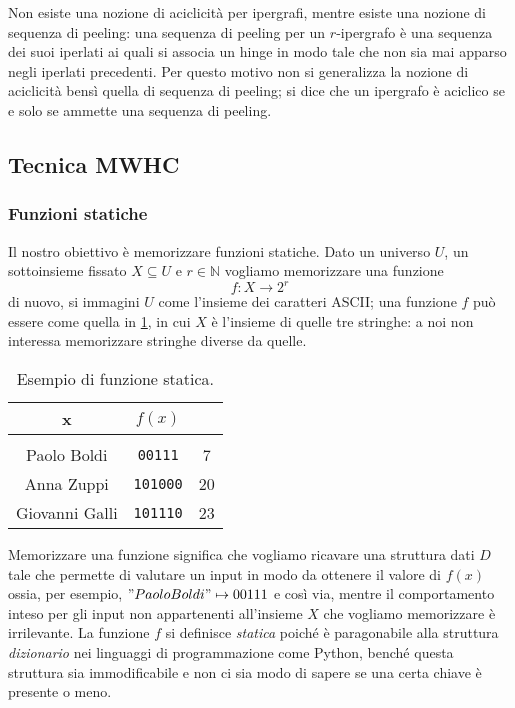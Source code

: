 Non esiste una nozione di aciclicità per ipergrafi, mentre esiste una nozione di
sequenza di peeling: una sequenza di peeling per un $r$-ipergrafo è una sequenza
dei suoi iperlati ai quali si associa un hinge in modo tale che non sia mai apparso
negli iperlati precedenti.
Per questo motivo non si generalizza la nozione di aciclicità bensì quella di sequenza di peeling;
si dice che un ipergrafo è aciclico se e solo se ammette una sequenza di peeling.


\subsection{Tecnica MWHC}
\subsubsection{Funzioni statiche}
Il nostro obiettivo è memorizzare funzioni statiche.
Dato un universo $U$, un sottoinsieme fissato $X \subseteq U$ e $r \in \mathbb{N}$
vogliamo memorizzare una funzione
$$
	f: X \rightarrow 2^r
$$
di nuovo, si immagini $U$ come l'insieme dei caratteri ASCII;
una funzione $f$ può essere come quella in \cref{tab:example:static_func},
in cui $X$ è l'insieme di quelle tre stringhe: a noi non interessa
memorizzare stringhe diverse da quelle.

\begin{table}[htpb]
	\begin{tabular}{c|c c}
		x              & $f(x)$          &    \\
		\hline                                \\
		Paolo Boldi    & \texttt{00111}  & 7  \\
		Anna Zuppi     & \texttt{101000} & 20 \\
		Giovanni Galli & \texttt{101110} & 23
	\end{tabular}
	\centering
	\caption{Esempio di funzione statica.}
	\label{tab:example:static_func}
\end{table}

Memorizzare una funzione significa che vogliamo ricavare una struttura
dati $D$ tale che permette di valutare un input in modo da ottenere
il valore di $f(x)$ ossia, per esempio, $"Paolo Boldi" \mapsto 00111$ e così via, mentre
il comportamento inteso per gli input non appartenenti all'insieme $X$
che vogliamo memorizzare è irrilevante.
La funzione $f$ si definisce \textit{statica} poiché è paragonabile
alla struttura \textit{dizionario} nei linguaggi di programmazione come
Python, benché questa struttura sia immodificabile e
non ci sia modo di sapere se una certa chiave è presente o meno.

